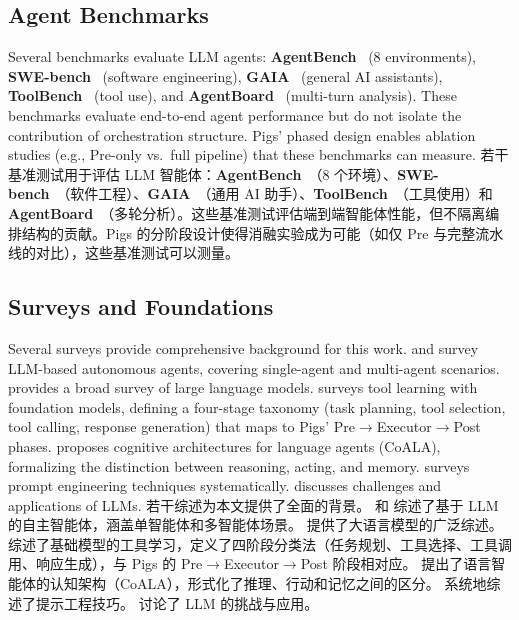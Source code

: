 \subsection{Agent Benchmarks}

Several benchmarks evaluate LLM agents: \textbf{AgentBench}~\citep{liu2023agentbench} (8 environments), \textbf{SWE-bench}~\citep{jimenez2024swebench} (software engineering), \textbf{GAIA}~\citep{mialon2023gaia} (general AI assistants), \textbf{ToolBench}~\citep{qin2023toolllm} (tool use), and \textbf{AgentBoard}~\citep{ma2024agentboard} (multi-turn analysis). These benchmarks evaluate end-to-end agent performance but do not isolate the contribution of orchestration structure. Pigs' phased design enables ablation studies (e.g., Pre-only vs.\ full pipeline) that these benchmarks can measure.
若干基准测试用于评估 LLM 智能体：\textbf{AgentBench}~\citep{liu2023agentbench}（8 个环境）、\textbf{SWE-bench}~\citep{jimenez2024swebench}（软件工程）、\textbf{GAIA}~\citep{mialon2023gaia}（通用 AI 助手）、\textbf{ToolBench}~\citep{qin2023toolllm}（工具使用）和 \textbf{AgentBoard}~\citep{ma2024agentboard}（多轮分析）。这些基准测试评估端到端智能体性能，但不隔离编排结构的贡献。Pigs 的分阶段设计使得消融实验成为可能（如仅 Pre 与完整流水线的对比），这些基准测试可以测量。

\subsection{Surveys and Foundations}

Several surveys provide comprehensive background for this work. \citet{xi2023rise} and \citet{wang2023agent_survey} survey LLM-based autonomous agents, covering single-agent and multi-agent scenarios. \citet{zhao2023llm_survey} provides a broad survey of large language models. \citet{qin2023tool_learning_survey} surveys tool learning with foundation models, defining a four-stage taxonomy (task planning, tool selection, tool calling, response generation) that maps to Pigs' Pre$\rightarrow$Executor$\rightarrow$Post phases. \citet{sumers2023coala} proposes cognitive architectures for language agents (CoALA), formalizing the distinction between reasoning, acting, and memory. \citet{schulhoff2024prompt} surveys prompt engineering techniques systematically. \citet{kaddour2023challenges} discusses challenges and applications of LLMs.
若干综述为本文提供了全面的背景。\citet{xi2023rise} 和 \citet{wang2023agent_survey} 综述了基于 LLM 的自主智能体，涵盖单智能体和多智能体场景。\citet{zhao2023llm_survey} 提供了大语言模型的广泛综述。\citet{qin2023tool_learning_survey} 综述了基础模型的工具学习，定义了四阶段分类法（任务规划、工具选择、工具调用、响应生成），与 Pigs 的 Pre$\rightarrow$Executor$\rightarrow$Post 阶段相对应。\citet{sumers2023coala} 提出了语言智能体的认知架构（CoALA），形式化了推理、行动和记忆之间的区分。\citet{schulhoff2024prompt} 系统地综述了提示工程技巧。\citet{kaddour2023challenges} 讨论了 LLM 的挑战与应用。

